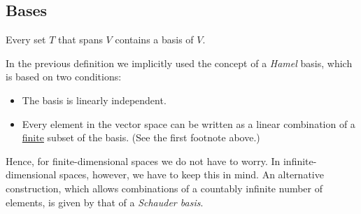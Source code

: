 

\subsection{Bases}

    \begin{property}
        Every set $T$ that spans $V$ contains a basis of $V$.
    \end{property}

    \begin{remark}
        In the previous definition we implicitly used the concept of a \textit{Hamel} basis, which is based on two conditions:
        \begin{itemize}
            \item The basis is linearly independent.
            \item Every element in the vector space can be written as a linear combination of a \underline{finite} subset of the basis. (See the first footnote above.)
        \end{itemize}
        Hence, for finite-dimensional spaces we do not have to worry. In infinite-dimensional spaces, however, we have to keep this in mind. An alternative construction, which allows combinations of a countably infinite number of elements, is given by that of a \textit{Schauder basis}.
    \end{remark}

